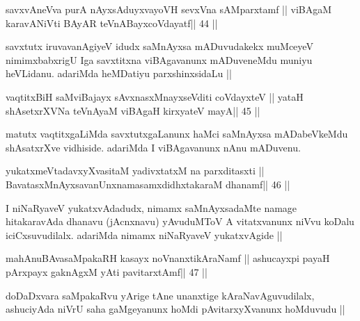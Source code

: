 
\begin{shl}
savxvAneVva purA nAyxsAduyxvayoVH sevxVna sAMparxtamf ||
viBAgaM karavANiVti BAyAR teVnABayxcoVdayatf\hfill || 44 ||
\end{shl}

\begin{artha}
savxtutx iruvavanAgiyeV idudx saMnAyxsa mADuvudakekx muMceyeV
nimimxbabxrigU Iga savxtitxna viBAgavanunx mADuveneMdu muniyu
heVLidanu. adariMda heMDatiyu parxshinxsidaLu || 
\end{artha}


\begin{shl}
\footnotemark[1]vaqtitxBiH saMviBajayx sAvxnasxMnayxseVditi coVdayxteV ||
yataH shAsetxrXVNa teVnAyaM viBAgaH kirxyateV mayA\hfill || 45 ||
\end{shl}

\begin{artha}
matutx vaqtitxgaLiMda savxtutxgaLanunx haMci saMnAyxsa
mADabeVkeMdu shAsatxrXve vidhiside. adariMda I viBAgavanunx nAnu 
mADuvenu. 
\end{artha}


\begin{shl}
yukatxmeVtadavxyXvasitaM yadivxtatxM na parxditasxti ||
BavatasxMnAyxsavanUnxnamasamxdidhxtakaraM dhanamf\hfill || 46 ||
\end{shl}

\begin{artha}
I niNaRyaveV yukatxvAdadudx, nimamx saMnAyxsadaMte namage hitakaravAda
dhanavu (jAcnxnavu) yAvuduMToV A vitatxvanunx niVvu koDalu
iciCxsuvudilalx. adariMda nimamx niNaRyaveV yukatxvAgide ||
\end{artha}


\begin{shl}
mahAnuBAvasaMpakaRH kasayx noVnanxtikAraNamf ||
ashucayxpi payaH pArxpayx gaknAgxM yAti pavitarxtAmf\hfill || 47 ||
\end{shl}

\begin{artha}
doDaDxvara saMpakaRvu yArige tAne unanxtige kAraNavAguvudilalx,
ashuciyAda niVrU saha gaMgeyanunx hoMdi pAvitarxyXvanunx hoMduvudu ||
\end{artha}

